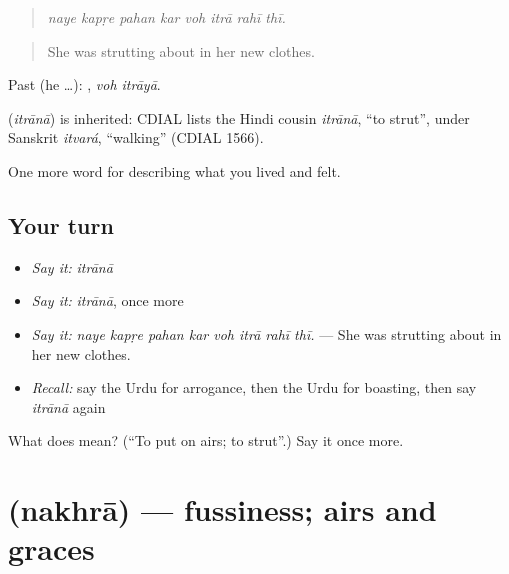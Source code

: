 \begin{quote}
       
\end{quote}

\begin{quote}
\emph{naye kapṛe pahan kar voh itrā rahī thī.}
\end{quote}

\begin{quote}
She was strutting about in her new clothes.
\end{quote}

Past (he …):  , \emph{voh itrāyā}.

\begin{cousinweb}
\textbf{} (\emph{itrānā}) is inherited: CDIAL lists the Hindi cousin \emph{itrānā}, \textquotedblleft{}to strut\textquotedblright{}, under Sanskrit \emph{itvará}, \textquotedblleft{}walking\textquotedblright{} (CDIAL 1566).
\end{cousinweb}

\begin{grammarlens}[title={What you've built}]
One more word for describing what you lived and felt.
\end{grammarlens}

\subsection*{Your turn}
\begin{itemize}
\raggedright
  \item \emph{Say it:} \emph{itrānā}
  \item \emph{Say it:} \emph{itrānā}, once more
  \item \emph{Say it:} \emph{naye kapṛe pahan kar voh itrā rahī thī.} — She was strutting about in her new clothes.
  \item \emph{Recall:} say the Urdu for arrogance, then the Urdu for boasting, then say \emph{itrānā} again
\end{itemize}

\begin{tcolorbox}[breakable,colback=teal!4,colframe=teal!35!black,title={Before you move on}]
What does  mean? (\textquotedblleft{}To put on airs; to strut\textquotedblright{}.) Say it once more.
\end{tcolorbox}
\section[\texorpdfstring{\ur{نخرا} (nakhrā)}{نخرا (nakhrā)}]{ (nakhrā) — fussiness; airs and graces}

